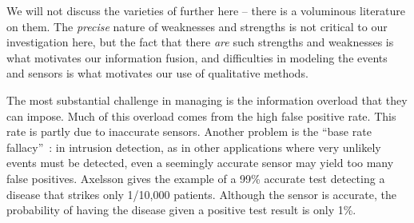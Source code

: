 We will not discuss the varieties of \idses further here -- there is a
voluminous literature on them.   The \emph{precise} nature of \ids weaknesses and
strengths is not critical to our investigation here, but the fact that there
\emph{are} such strengths and weaknesses is what motivates our information
fusion, and difficulties in modeling the events and sensors is what motivates
our use of qualitative methods.
 
The most substantial challenge in managing \idses is the information overload
that they can impose.
Much of this overload comes from the high false positive rate.  This rate is
partly due to
inaccurate sensors.
Another problem is the ``base rate fallacy''~\cite{Axelsson:1999:BFI:319709.319710}:
in intrusion detection, as in
other applications where very unlikely events must be detected, even a seemingly
accurate sensor may yield too many false positives.  Axelsson gives the example
of a 99\% accurate test detecting a disease that strikes only 1/10,000
patients.  
Although the sensor is accurate, 
the probability of having the disease given a positive test result is
only 1\%.

